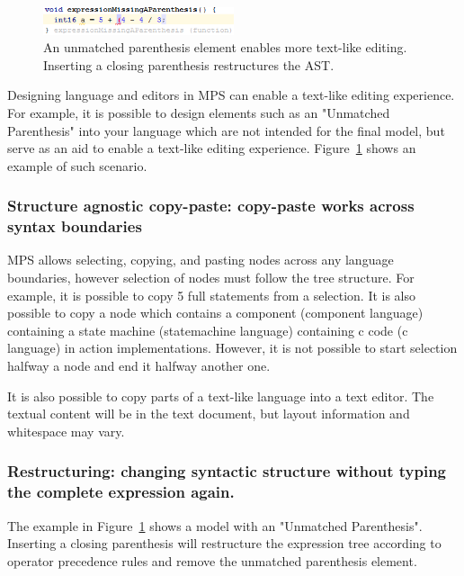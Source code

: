 \documentclass[preprint,numbers,10pt]{sigplanconf}
\begin{document}
\begin{figure}[H]
	\centering
	\includegraphics[width=0.5\textwidth]{screens/UnmatchedParenthesis.png}
	\caption{An unmatched parenthesis element enables more text-like editing. Inserting a closing parenthesis restructures the AST.}
	\label{fig:UnmatchedParenthesis}
\end{figure}

Designing language and editors in MPS can enable a text-like editing experience. For example,
 it is possible to design elements such as an "Unmatched Parenthesis" into your language which are not intended for the final model, but serve as an aid to enable a text-like editing experience.
 Figure~\ref{fig:UnmatchedParenthesis} shows an example of such scenario.



\subsubsection{Structure agnostic copy-paste: copy-paste works across syntax boundaries}
MPS allows selecting, copying, and pasting nodes across any language boundaries, however selection of nodes must follow the tree structure. For example, it is possible to copy 5 full statements from a selection. It is also possible to copy a node which contains a component (component language) containing a state machine (statemachine language) containing c code (c language) in action implementations. However, it is not possible to start selection halfway a node and end it halfway another one.

It is also possible to copy parts of a text-like language into a text editor. The textual content will be in the text document, but layout information and whitespace may vary.

\subsubsection{Restructuring: changing syntactic structure without typing the complete expression again.}
The example in Figure~\ref{fig:UnmatchedParenthesis} shows a model with an "Unmatched Parenthesis". Inserting a closing parenthesis will restructure the expression tree according to operator precedence rules and remove the unmatched parenthesis element.
\end{document}
